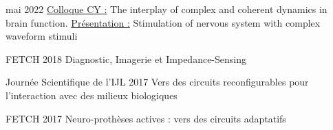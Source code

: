 \begin{cvskills}   
  \cvskill
     {mai 2022} %
    {\underline{Colloque CY :} The interplay of complex and coherent dynamics in brain function. \underline{Présentation :} Stimulation of nervous system with complex waveform stimuli} %
\end{cvskills}
\begin{cvskills}   
  \cvskill
    {FETCH 2018} %
    {Diagnostic, Imagerie et Impedance-Sensing } %
\end{cvskills}
\begin{cvskills}   
  \cvskill
    {Journée Scientifique de l’IJL 2017} %
    {Vers des circuits reconfigurables pour l’interaction avec des milieux biologiques} %
\end{cvskills}
\begin{cvskills}   
  \cvskill
    {FETCH 2017} %
    {Neuro-prothèses actives : vers des circuits adaptatifs} %
\end{cvskills}